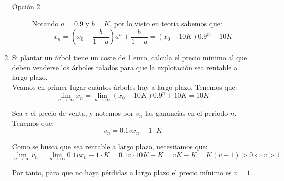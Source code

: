 \begin{ejercicio}
\begin{enumerate}
\begin{description}
            \item[Opción 2.] Notando $a=0.9$ y $b=K$, por lo visto en teoría sabemos que:
            \begin{equation*}
                x_n = \left(x_0-\frac{b}{1-a}\right)a^n + \frac{b}{1-a}
                = (x_0-10K)0.9^n + 10K
            \end{equation*}
        \end{description}

        
        \item Si plantar un árbol tiene un coste de 1 euro, calcula el precio mínimo al que deben venderse los árboles talados para que la explotación sea rentable a largo plazo.\\

        Veamos en primer lugar cuántos árboles hay a largo plazo. Tenemos que:
        \begin{equation*}
            \lim_{n\to \infty} x_n = \lim_{n\to \infty}
            (x_0-10K)0.9^n + 10K = 10K
        \end{equation*}

        Sea $v$ el precio de venta, y notemos por $v_n$ las ganancias en el periodo $n$. Tenemos que:
        \begin{equation*}
            v_n = 0.1vx_n -1\cdot K
        \end{equation*}

        Como se busca que sea rentable a largo plazo, necesitamos que:
        \begin{equation*}
            \lim_{n\to \infty} v_n
            = \lim_{n\to \infty} 0.1vx_n -1\cdot K
            = 0.1v\cdot 10K - K = vK -K=K(v-1) > 0 \Longleftrightarrow v>1
        \end{equation*}

        Por tanto, para que no haya pérdidas a largo plazo el precio mínimo es $v=1$.
    \end{enumerate}
\end{ejercicio}


